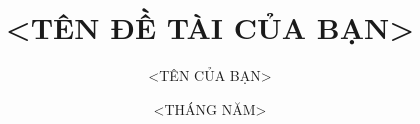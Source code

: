 
 

\title{<TÊN ĐỀ TÀI CỦA BẠN>}
\author{<TÊN CỦA BẠN>}
\date{<THÁNG NĂM>}





\pagestyle{plain} 





\clearpage

\clearpage

\tableofcontents
\clearpage

\listoffigures
\clearpage
\listoftables

\clearpage
{} 
\pagestyle{fancy} 






\clearpage
\pagestyle{plain} 

\printbibliography


